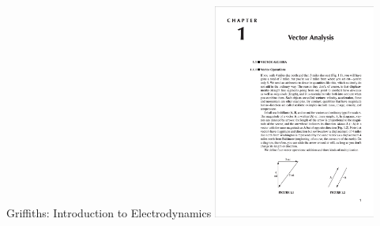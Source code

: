 \documentclass{beamer}
\begin{document}
\begin{frame}[fragile]{Griffiths: Introduction to Electrodynamics}
  \includegraphics[frame,width=0.4\textwidth]{griffiths}
\end{frame}
\end{document}
